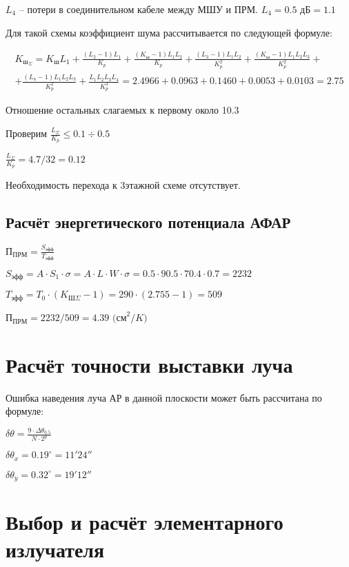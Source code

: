 $L_4$ -- потери в соединительном кабеле между МШУ и ПРМ. $L_4=0.5 \text{ дБ}=1.1$

Для такой схемы коэффициент шума рассчитывается по следующей формуле:

\begin{multline*} \displaystyle K_{\text{ш}_\Sigma}=K_\text{ш}L_1+\frac{(L_2-1)L_1}{K_p}+\frac{(K_\text{ш}-1)L_1L_2}{K_p}+\frac{(L_3-1)L_1L_2}{K^2_p}+\frac{(K_\text{ш}-1)L_1L_2L_3}{K^2_p}+\\+\frac{(L_4-1)L_1L_2L_3}{K^2_p}+\frac{L_1L_2L_3L_4}{K^3_p} = 2.4966 + 0.0963 + 0.1460 + 0.0053 + 0.0103 = 2.75\end{multline*}

Отношение остальных слагаемых к первому около 10.3%

Проверим $\displaystyle \frac{L_\Sigma}{K_p}\leq 0.1\div0.5$

$\displaystyle \frac{L_\Sigma}{K_p}=4.7/32=0.12$

Необходимость перехода к 3этажной схеме отсутствует.

\subsection{Расчёт энергетического потенциала АФАР}

$\displaystyle \text{П}_\text{ПРМ}=\frac{S_\text{эфф}}{T_\text{эфф}}$


$\displaystyle S_\text{эфф}=A \cdot S_1 \cdot \sigma = A \cdot L \cdot W \cdot \sigma = 0.5\cdot90.5\cdot70.4\cdot0.7 = 2232$

$T_\text{эфф}=T_0\cdot(K_{\text{Ш}\Sigma}-1)=290\cdot(2.755-1)=509$

$\text{П}_\text{ПРМ}=2232/509 = 4.39 \text{ (см}^2/K)$

\section{Расчёт точности выставки луча}

Ошибка наведения луча АР в данной плоскости может быть рассчитана по формуле:

$\displaystyle \delta\theta=\frac{9\cdot\Delta\theta_{0.5}}{N\cdot2^p}$

$\delta\theta_x=0.19^\circ=11'24''$ 

$\delta\theta_y=0.32^\circ=19'12''$

\section{Выбор и расчёт элементарного излучателя}

